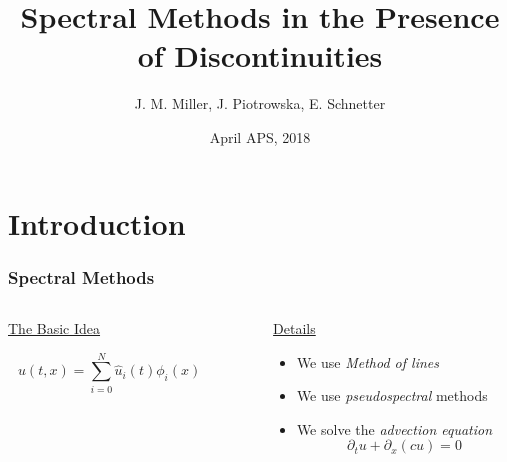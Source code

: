 \documentclass[9pt,usepdftitle=false,aspectratio=169]{beamer}
\title[Spectral Discontinuities]{Spectral Methods in the Presence of Discontinuities}
\author[Co-Design Summer School]{
  J. M. Miller,
  {\texorpdfstring{\color{blue}}{}J. Piotrowska},
  E. Schnetter}
\institute[LANL]{\color{blue}Los Alamos National Laboratory}
\date[April APS]{\color{black}April APS, 2018}
\begin{document}
\section{Introduction}
\begin{frame}[plain]
  \titlepage
\end{frame}

\begin{frame}
  \frametitle{Spectral Methods}
  \begin{columns}
    \begin{column}{0.5\textwidth}
      \begin{center}
        \underline{\huge\color{blue}The Basic Idea}\\
        \vspace{0.75cm}
        \begin{huge}
          $$u(t,x) = \sum_{i=0}^N\hat{u}_i(t)\phi_i(x)$$
        \end{huge}
        \vspace{2cm}
      \end{center}
    \end{column}
    \vrule{}
    \begin{column}{0.05\textwidth}\end{column}
    \begin{column}{0.45\textwidth}
      \begin{center}
        \underline{\huge\color{red}Details}
      \end{center}
      \vspace{1.2cm}
      \begin{itemize}
      \item We use \textit{Method of lines}
      \item We use \textit{pseudospectral} methods
      \item We solve the \textit{advection equation}
        { \huge
          $$\partial_t u + \partial_x (c u) = 0 $$
        }
      \end{itemize}
      \vspace{1cm}
    \end{column}
  \end{columns}
\end{frame}
\end{document}
